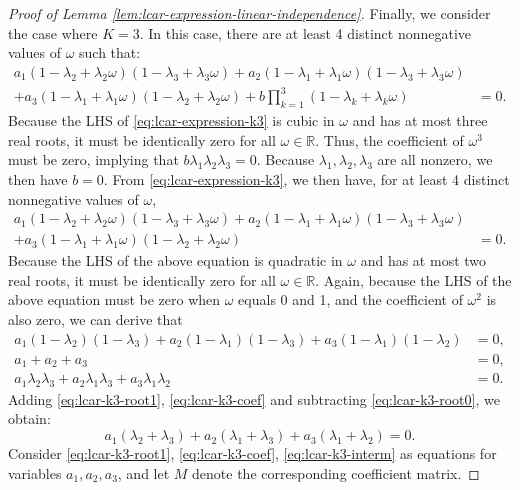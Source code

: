 \documentclass[11pt]{article}
\theoremstyle{definition}
\theoremstyle{remark}
\begin{document}
\begin{proof}[Proof of Lemma \ref{lem:lcar-expression-linear-independence}]
Finally, we consider the case where $K=3$. In this case, there are at least 4 distinct nonnegative values of $\omega$ such that: 
\begin{align}
a_1(1-\lambda_2+\lambda_2\omega)(1-\lambda_3+\lambda_3\omega) + a_2(1-\lambda_1+\lambda_1\omega)(1-\lambda_3+\lambda_3\omega) & \nonumber\\  + a_3 (1-\lambda_1+\lambda_1 \omega)(1-\lambda_2+\lambda_2\omega)+ b \prod_{k=1}^3 (1-\lambda_k +\lambda_k \omega) & =0 \label{eq:lcar-expression-k3}. 
\end{align} 
Because the LHS of \eqref{eq:lcar-expression-k3} is cubic in $\omega$ and has at most three real roots, 
it must be identically zero for all $\omega\in \mathbb{R}$. 
Thus, the coefficient of $\omega^3$ must be zero, implying that 
$b\lambda_1\lambda_2\lambda_3 =0.$
Because $\lambda_1, \lambda_2, \lambda_3$ are all nonzero, we then have $b=0$. 
From \eqref{eq:lcar-expression-k3}, 
we then have, for at least 4 distinct nonnegative values of $\omega$, 
\begin{align*}
    a_1(1-\lambda_2+\lambda_2\omega)(1-\lambda_3+\lambda_3\omega) + a_2(1-\lambda_1+\lambda_1\omega)(1-\lambda_3+\lambda_3\omega) &  \\
    + a_3 (1-\lambda_1+\lambda_1 \omega)(1-\lambda_2+\lambda_2\omega) & =0. 
\end{align*}
Because the LHS of the above equation is quadratic in $\omega$ and has at most two real roots, it must be identically zero for all $\omega\in \mathbb{R}$. 
Again, 
because the LHS of the above equation must be zero when $\omega$ equals 0 and 1, and the coefficient of $\omega^2$ is also zero, we can derive that 
\begin{align}
    \label{eq:lcar-k3-root0}
a_1(1-\lambda_2)(1-\lambda_3) + a_2(1-\lambda_1)(1-\lambda_3) + a_3 (1-\lambda_1)(1-\lambda_2) & =0,
\\
\label{eq:lcar-k3-root1}
a_1+a_2+a_3 & = 0,
\\
\label{eq:lcar-k3-coef}
a_1\lambda_2\lambda_3 + a_2\lambda_1\lambda_3+a_3\lambda_1\lambda_2 & =0.
\end{align}
Adding \eqref{eq:lcar-k3-root1}, \eqref{eq:lcar-k3-coef} and subtracting \eqref{eq:lcar-k3-root0}, we obtain:
\begin{equation}\label{eq:lcar-k3-interm}
a_1(\lambda_2+\lambda_3) + a_2(\lambda_1+\lambda_3) + a_3(\lambda_1+\lambda_2)=0.
\end{equation}
Consider \eqref{eq:lcar-k3-root1},  \eqref{eq:lcar-k3-coef},  \eqref{eq:lcar-k3-interm} as equations for variables $a_1, a_2, a_3$, and let $M$ denote the corresponding coefficient matrix. 

\end{proof}
\end{document}
